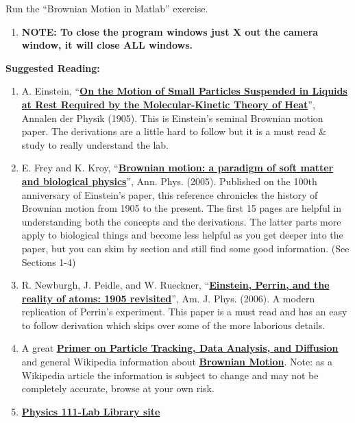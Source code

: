 \documentclass{../lab}
\begin{document}
Run the ``Brownian Motion in Matlab'' exercise.

\begin{enumerate}
    \item \textbf{NOTE: To close the program windows just X out the camera window, it will close ALL windows.}
\end{enumerate}

\textbf{Suggested Reading:}

\begin{enumerate}
    \item A. Einstein, ``\href{http://physics111.lib.berkeley.edu/Physics111/Reprints/BMC/Einstein\_Diffusion1905.pdf}{\textbf{On the Motion of Small Particles Suspended in Liquids at Rest Required by the Molecular-Kinetic Theory of Heat}}'', Annalen der Physik (1905). This is Einstein’s seminal Brownian motion paper. The derivations are a little hard to follow but it is a must read \& study to really understand the lab.

    \item E. Frey and K. Kroy, ``\href{http://physics111.lib.berkeley.edu/Physics111/Reprints/BMC/Brownian\%20Motion\%20-\%20Frey.pdf}{\textbf{Brownian motion: a paradigm of soft matter and biological physics}}'', Ann. Phys. (2005). Published on the 100th anniversary of Einstein’s paper, this reference chronicles the history of Brownian motion from 1905 to the present. The first 15 pages are helpful in understanding both the concepts and the derivations. The latter parts more apply to biological things and become less helpful as you get deeper into the paper, but you can skim by section and still find some good information. (See Sections 1-4)

    \item R. Newburgh, J. Peidle, and W. Rueckner, ``\href{http://physics111.lib.berkeley.edu/Physics111/Reprints/BMC/Newburgh-Einstein-Perrin1905_Revisited.pdf}{\textbf{Einstein, Perrin, and the reality of atoms: 1905 revisited}}'', Am. J. Phys. (2006). A modern replication of Perrin's experiment. This paper is a must read and has an easy to follow derivation which skips over some of the more laborious details.

    \item A great \href{http://www.physics.nyu.edu/grierlab/methods/methods.html}{\textbf{Primer on Particle Tracking, Data Analysis, and Diffusion}} and general Wikipedia information about \href{http://en.wikipedia.org/wiki/Brownian\_motion}{\textbf{Brownian Motion}}. Note: as a Wikipedia article the information is subject to change and may not be completely accurate, browse at your own risk.

    \item \href{\LabReprints}{\textbf{Physics 111-Lab Library site}}
\end{enumerate}
\end{document}
